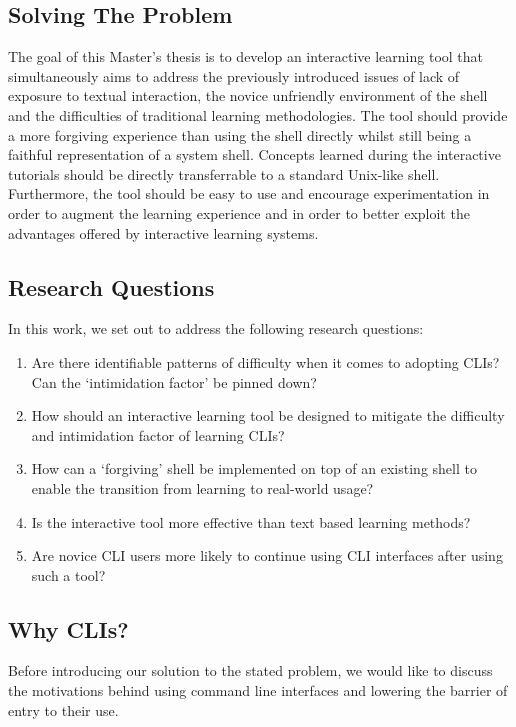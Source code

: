 \subsection{Solving The Problem} The goal of this Master's thesis is to develop
an interactive learning tool that simultaneously aims to address the previously
introduced issues of lack of exposure to textual interaction, the novice
unfriendly environment of the shell and the difficulties of traditional
learning methodologies. The tool should provide a more forgiving experience
than using the shell directly whilst still being a faithful representation of a
system shell. Concepts learned during the interactive tutorials should be
directly transferrable to a standard Unix-like shell. Furthermore, the tool
should be easy to use and encourage experimentation in order to augment the
learning experience and in order to better exploit the advantages offered by
interactive learning systems.

\subsection{Research Questions}
\label{subsec:rqs}

In this work, we set out to address the following research questions:

\begin{enumerate}[label=\textbf{RQ\arabic*}, leftmargin=*]
	\item Are there identifiable patterns of difficulty when it
	      comes to adopting CLIs? Can the `intimidation factor' be pinned down? \label{rq:1}
	\item How should an interactive learning tool be designed to mitigate
	      the difficulty and intimidation factor of learning CLIs? \label{rq:2}
	\item How can a `forgiving' shell be implemented on top of an existing
	      shell to enable the transition from learning to real-world usage? \label{rq:3}
	\item Is the interactive tool more effective than text based learning methods? \label{rq:4}
	\item Are novice CLI users more likely to continue
	      using CLI interfaces after using such a tool? \label{rq:5}
\end{enumerate}

\subsection{Why CLIs?}
Before introducing our solution to the stated problem, we would like to discuss
the motivations behind using command line interfaces and lowering the barrier of
entry to their use.

